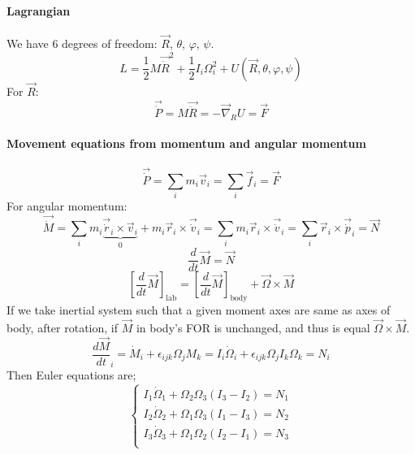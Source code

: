 \paragraph{Lagrangian}
We have 6 degrees of freedom: $\vec{R}$, $\theta$, $\varphi$, $\psi$.
$$L = \frac{1}{2} M \vec{\dot{R}}^2 + \frac{1}{2} I_i \Omega_i^2 + U\left( \vec{R}, \theta, \varphi, \psi \right)$$
For $\vec{R}$:
$$\vec{\dot{P}}=M\vec{\ddot{R}} = -\vec{\nabla}_R U = \vec{F}$$
\paragraph{Movement equations from momentum and angular momentum}
$$\vec{\dot{P}} = \sum_i m_i \vec{v}_i = \sum_i \vec{f}_i = \vec{F}$$
For angular momentum:
$$\vec{\dot{M}} = \sum_i m_i \underbrace{\vec{\dot{r}}_i \times \vec{v}_i}_{0} + m_i \vec{r}_i \times \vec{\dot{v}}_i =  \sum_i m_i \vec{r}_i \times \vec{\dot{v}}_i =  \sum_i \vec{r}_i \times \vec{\dot{p}}_i = \vec{N}$$
$$\frac{d}{dt} \vec{M} = \vec{N}$$
$$\left[\frac{d}{dt} \vec{M}\right]_{\text{lab}} = \left[\frac{d}{dt} \vec{M}\right]_{\text{body}} + \vec{\Omega} \times \vec{M}$$
If we take inertial system such that a given moment axes are same as axes of body, after rotation, if $\vec{M}$ in body's FOR is unchanged, and thus is equal $\vec{\Omega}\times \vec{M}$.
$$\frac{d\vec{M}}{dt}_i = \dot{M}_i + \epsilon_{ijk} \Omega_j M_k = I_i \dot{\Omega}_i + \epsilon_{ijk} \Omega_j I_k \Omega_k = N_i$$
Then Euler equations are;
$$\begin{cases}
 I_1 \dot{\Omega}_1 + \Omega_2 \Omega_3 (I_3-I_2) = N_1\\
 I_2 \dot{\Omega}_2 + \Omega_1 \Omega_3 (I_1-I_3) = N_2\\
 I_3 \dot{\Omega}_3 + \Omega_1 \Omega_2 (I_2-I_1) = N_3\\
\end{cases}$$

